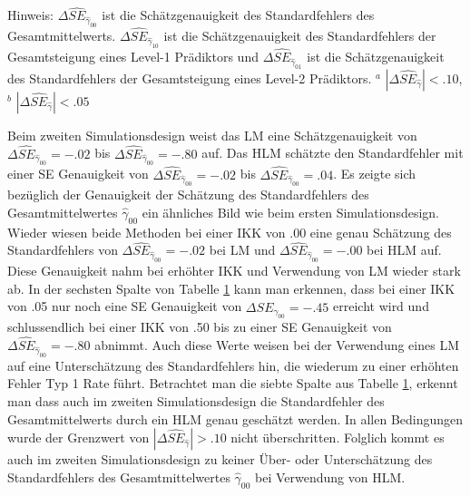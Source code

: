 \documentclass[12pt]{article}\usepackage[]{graphicx}\usepackage[]{color}
\begin{document}
\begin{table}[t!]
\begin{threeparttable}
\begin{tabular}{lcccccccc}
\bottomrule
\end{tabular}
\label{tab:study1_results}
\begin{tablenotes}[flushleft]
\footnotesize
\item Hinweis: $\Delta\widehat{SE}_{\widehat{\gamma}_{00}}$ ist die Schätzgenauigkeit des Standardfehlers des Gesamtmittelwerts. $\Delta\widehat{SE}_{\widehat{\gamma}_{10}}$ ist die Schätzgenauigkeit des Standardfehlers der Gesamtsteigung eines Level-1 Prädiktors und $\Delta\widehat{SE}_{\widehat{\gamma}_{01}}$ ist die Schätzgenauigkeit des Standardfehlers der Gesamtsteigung eines Level-2 Prädiktors. $^a$ $|\Delta\widehat{SE}_{\widehat{\gamma}}| < .10$, $^b$ $|\Delta\widehat{SE}_{\widehat{\gamma}}| < .05$
\end{tablenotes}
\end{threeparttable}
\end{table}

Beim zweiten Simulationsdesign weist das LM eine Schätzgenauigkeit von $\Delta\widehat{SE}_{\widehat{\gamma}_{00}} = -.02$ bis $\Delta\widehat{SE}_{\widehat{\gamma}_{00}} = -.80$ auf. Das HLM schätzte den Standardfehler mit einer SE Genauigkeit von $\Delta\widehat{SE}_{\widehat{\gamma}_{00}} = -.02$ bis $\Delta\widehat{SE}_{\widehat{\gamma}_{00}} = .04$. Es zeigte sich bezüglich der Genauigkeit der Schätzung des Standardfehlers des Gesamtmittelwertes $\widehat{\gamma}_{00}$ ein ähnliches Bild wie beim ersten Simulationsdesign. Wieder wiesen beide Methoden bei einer IKK von .00 eine genau Schätzung des Standardfehlers von $\Delta\widehat{SE}_{\widehat{\gamma}_{00}} = -.02$ bei LM und $\Delta\widehat{SE}_{\widehat{\gamma}_{00}} = -.00$ bei HLM auf. Diese Genauigkeit nahm bei erhöhter IKK und Verwendung von LM wieder stark ab. In der sechsten Spalte von Tabelle \ref{tab:study1_results} kann man erkennen, dass bei einer IKK von .05 nur noch eine SE Genauigkeit von $\Delta\widehat{SE}_{\widehat{\gamma}_{00}} = -.45$ erreicht wird und schlussendlich bei einer IKK von .50 bis zu einer SE Genauigkeit von $\Delta\widehat{SE}_{\widehat{\gamma}_{00}} = -.80$ abnimmt. Auch diese Werte weisen bei der Verwendung eines LM auf eine Unterschätzung des Standardfehlers hin, die wiederum zu einer erhöhten Fehler Typ 1 Rate führt. Betrachtet man die siebte Spalte aus Tabelle \ref{tab:study1_results}, erkennt man dass auch im zweiten Simulationsdesign die Standardfehler des Gesamtmittelwerts durch ein HLM genau geschätzt werden. In allen Bedingungen wurde der Grenzwert von $|\Delta\widehat{SE}_{\widehat{\gamma}}| > .10$ nicht überschritten. Folglich kommt es auch im zweiten Simulationsdesign zu keiner Über- oder Unterschätzung des Standardfehlers des Gesamtmittelwertes $\widehat{\gamma}_{00}$ bei Verwendung von HLM.
\end{document}
